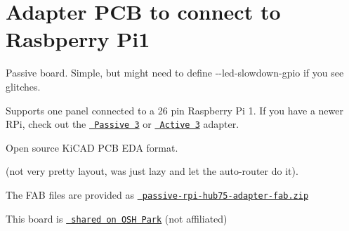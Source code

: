 \chapter{Adapter PCB to connect to Rasbperry Pi1}
\hypertarget{md_matrix_2adapter_2passive-rpi1_2README}{}\label{md_matrix_2adapter_2passive-rpi1_2README}

\begin{DoxyItemize}
\item Passive board. Simple, but might need to define {\ttfamily -\/-\/led-\/slowdown-\/gpio} if you see glitches.
\item Supports one panel connected to a 26 pin Raspberry Pi 1. If you have a newer RPi, check out the \href{../passive-3}{\texttt{ Passive 3}} or \href{../active-3}{\texttt{ Active 3}} adapter.
\item Open source Ki\+CAD PCB EDA format.
\item (not very pretty layout, was just lazy and let the auto-\/router do it).
\item The FAB files are provided as \href{./passive-rpi-hub75-adapter-fab.zip}{\texttt{ passive-\/rpi-\/hub75-\/adapter-\/fab.\+zip}}
\end{DoxyItemize}

This board is \href{https://oshpark.com/shared_projects/afEA1gNt}{\texttt{ shared on OSH Park}} (not affiliated)

 